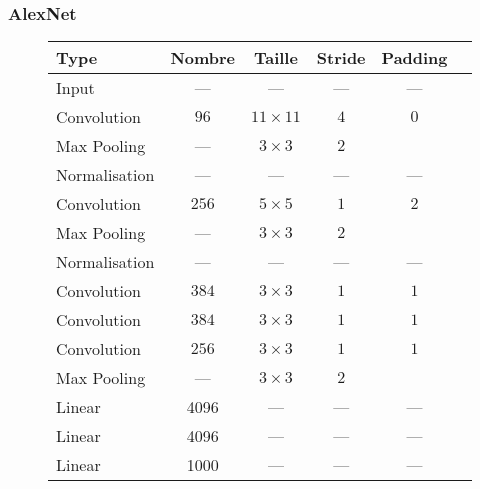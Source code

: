 \documentclass{formation}
\begin{document}
\begin{frame}
  \frametitle{AlexNet}
    \begin{figure}
      \centering
      \begin{tabular}{lccccc}
        \toprule
        Type        & Nombre & Taille         & Stride & Padding \\
        \midrule
        Input       & ---    & ---            & ---    & ---     \\
        \rowcolor{green}
        Convolution   & $96$   & $11 \times 11$ & $4$    & $0$     \\
        \rowcolor{red}
        Max Pooling   & ---    & $3 \times 3$   & $2$    &         \\
        \rowcolor{cyan}
        Normalisation & ---    & ---            & ---    & ---     \\
        \rowcolor{green}
        Convolution   & $256$  & $5 \times 5$   & $1$    & $2$     \\
        \rowcolor{red}
        Max Pooling   & ---    & $3 \times 3$   & $2$    &         \\
        \rowcolor{cyan}
        Normalisation & ---    & ---            & ---    & ---     \\
        \rowcolor{green}
        Convolution   & $384$  & $3 \times 3$   & $1$    & $1$     \\
        \rowcolor{green}
        Convolution   & $384$  & $3 \times 3$   & $1$    & $1$     \\
        \rowcolor{green}
        Convolution   & $256$  & $3 \times 3$   & $1$    & $1$     \\
        \rowcolor{red}
        Max Pooling   & ---    & $3 \times 3$   & $2$    &         \\
        \rowcolor{yellow}
        Linear        & 4096   & ---            & ---    & ---     \\
        \rowcolor{yellow}
        Linear        & 4096   & ---            & ---    & ---     \\
        \rowcolor{yellow}
        Linear        & 1000   & ---            & ---    & ---     \\
        \bottomrule
      \end{tabular}
    \end{figure}
\end{frame}
\end{document}
